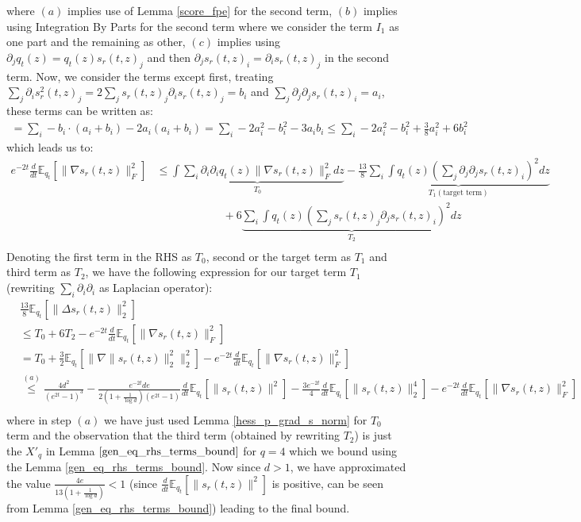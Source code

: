 \documentclass{article}
\begin{document}
where $(a)$ implies use of Lemma \ref{score_fpe} for the second term, $(b)$ implies using Integration By Parts for the second term where we consider the term $I_1$ as one part and the remaining as other, $(c)$ implies using $\partial_jq_t(z) = q_t(z)s_r(t,z)_j$ and then $\partial_js_r(t,z)_i = \partial_is_r(t,z)_j $ in the second term.
Now, we consider the terms except first, 
treating $\sum_j\partial_is^2_r(t,z)_j=2\sum_j s_r(t,z)_j \partial_i s_r(t,z)_j = b_i$ and $\sum_j \partial_j \partial_j s_r(t,z)_i = a_i$, these terms can be written as:
\begin{align*}
    = \sum_i  - b_i \cdot (a_i+b_i) - 2a_i(a_i+b_i)  = \sum_i - 2a_i^2 -b_i^2 - 3a_ib_i \leq \sum_i - 2a_i^2 -b_i^2 + \frac{3}{8}a^2_i + {6}b^2_i
\end{align*}
which leads us to:
{
\begin{align*}
   e^{-2t} \frac{d}{dt} \mathbb{E}_{q_t}\left[\|\nabla s_r(t,z)\|^2_F\right] &\leq \underbrace{\int  \sum_i \partial_i\partial_i q_t(z) \|\nabla s_r(t,z)\|^2_F dz}_{T_0} - \frac{13}{8} \underbrace{\sum_{i} 
 \int  q_t(z) \left(\sum_j \partial_j \partial_j s_r(t,z)_i \right)^2   dz}_{T_1 ({\text{target term}})} \\
 & \qquad \qquad \qquad +6 \underbrace{\sum_{i} 
 \int  q_t(z) \left(\sum_j s_r(t,z)_j \partial_j s_r(t,z)_i \right)^2   dz}_{T_2} \qquad \\ 
\end{align*}
}
{Denoting the first term in the RHS as $T_0$, second or the target term as $T_1$ and third term as $T_2$, we have the following expression for our target term $T_1$ (rewriting $\sum_i\partial_i\partial_i$ as Laplacian operator):
\begin{align*}
     &\frac{13}{8}\mathbb{E}_{q_t}\left[\|\Delta s_r(t,z)\|_2^2\right] \\
     &\leq T_0+6T_2- e^{-2t}\frac{d}{dt}\mathbb{E}_{q_t}\left[\|\nabla s_r(t,z)\|_F^2\right] \\
     &= T_0+\frac{3}{2}\mathbb{E}_{q_t}\left[\|\nabla \|s_r(t,z)\|^2_2\|_2^2\right]- e^{-2t}\frac{d}{dt}\mathbb{E}_{q_t}\left[\|\nabla s_r(t,z)\|_F^2\right] \tag{rewriting $T_2$}\\
     &\overset{(a)}{\leq}  \frac{4d^2}{(e^{2t}-1)^{3}}    -  \frac{e^{-2t}de}{2(1+\frac{1}{\log d})(e^{2t}-1)}\frac{d}{dt}\mathbb{E}_{q_t}[\|s_r(t,z)\|^2]   -\frac{3e^{-2t}}{4}\frac{d}{dt}  \mathbb{E}_{q_t}\left[\|s_r(t,z)\|^4_2\right]- e^{-2t}\frac{d}{dt}\mathbb{E}_{q_t}\left[\|\nabla s_r(t,z)\|_F^2\right]  \\
\end{align*}
where in step $(a)$ we have just used Lemma \ref{hess_p_grad_s_norm} for $T_0$ term and the  observation that the third term (obtained by rewriting $T_2$) is just the $X'_q$ in Lemma $\ref{gen_eq_rhs_terms_bound}$ for $q=4$ which we bound using the Lemma \ref{gen_eq_rhs_terms_bound}. Now since $d> 1$, we have approximated the value $\frac{4e}{13(1+\frac{1}{\log d})} < 1$ (since $\frac{d}{dt}\mathbb{E}_{q_t}[\|s_r(t,z)\|^2]$ is positive, can be seen from Lemma \ref{gen_eq_rhs_terms_bound}) leading to the final bound. 
}
\end{document}
